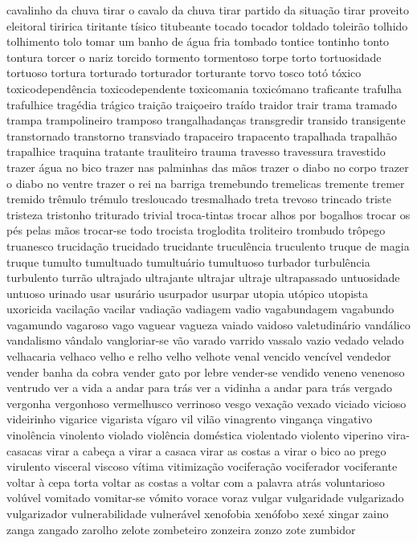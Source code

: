 \documentclass[ruledheader]{abnt_UFF}
\begin{document}
cavalinho da chuva tirar o cavalo da chuva tirar partido da situa\c{c}\~ao tirar proveito eleitoral tiririca tiritante t\'{i}sico titubeante tocado tocador toldado toleir\~ao tolhido tolhimento tolo tomar um banho de \'{a}gua fria tombado tontice tontinho tonto tontura torcer o nariz torcido tormento tormentoso torpe torto tortuosidade tortuoso tortura torturado torturador torturante torvo tosco tot\'{o} t\'{o}xico toxicodepend\^{e}ncia toxicodependente toxicomania toxic\'{o}mano traficante trafulha trafulhice trag\'{e}dia tr\'{a}gico trai\c{c}\~ao trai\c{c}oeiro tra\'{i}do traidor trair trama tramado trampa trampolineiro tramposo trangalhadan\c{c}as transgredir transido transigente transtornado transtorno transviado trapaceiro trapacento trapalhada trapalh\~ao trapalhice traquina tratante trauliteiro trauma travesso travessura travestido trazer \'{a}gua no bico trazer nas palminhas das m\~aos trazer o diabo no corpo trazer o diabo no ventre trazer o rei na barriga tremebundo tremelicas tremente tremer tremido tr\^{e}mulo tr\'{e}mulo tresloucado tresmalhado treta trevoso trincado triste tristeza tristonho triturado trivial troca-tintas trocar alhos por bogalhos trocar os p\'{e}s pelas m\~aos trocar-se todo trocista troglodita troliteiro trombudo tr\^{o}pego truanesco trucida\c{c}\~ao trucidado trucidante trucul\^{e}ncia truculento truque de magia truque tumulto tumultuado tumultu\'{a}rio tumultuoso turbador turbul\^{e}ncia turbulento turr\~ao ultrajado ultrajante ultrajar ultraje ultrapassado untuosidade untuoso urinado usar usur\'{a}rio usurpador usurpar utopia ut\'{o}pico utopista uxoricida vacila\c{c}\~ao vacilar vadia\c{c}\~ao vadiagem vadio vagabundagem vagabundo vagamundo vagaroso vago vaguear vagueza vaiado vaidoso valetudin\'{a}rio vand\'{a}lico vandalismo v\^{a}ndalo vangloriar-se v\~ao varado varrido vassalo vazio vedado velado velhacaria velhaco velho e relho velho velhote venal vencido venc\'{i}vel vendedor vender banha da cobra vender gato por lebre vender-se vendido veneno venenoso ventrudo ver a vida a andar para tr\'{a}s ver a vidinha a andar para tr\'{a}s vergado vergonha vergonhoso vermelhusco verrinoso vesgo vexa\c{c}\~ao vexado viciado vicioso videirinho vigarice vigarista v\'{i}garo vil vil\~ao vinagrento vingan\c{c}a vingativo vinol\^{e}ncia vinolento violado viol\^{e}ncia dom\'{e}stica violentado violento viperino vira-casacas virar a cabe\c{c}a a virar a casaca virar as costas a virar o bico ao prego virulento visceral viscoso v\'{i}tima vitimiza\c{c}\~ao vocifera\c{c}\~ao vociferador vociferante voltar \`{a} cepa torta voltar as costas a voltar com a palavra atr\'{a}s voluntarioso vol\'{u}vel vomitado vomitar-se v\'{o}mito vorace voraz vulgar vulgaridade vulgarizado vulgarizador vulnerabilidade vulner\'{a}vel xenofobia xen\'{o}fobo xex\'{e} xingar zaino zanga zangado zarolho zelote zombeteiro zonzeira zonzo zote zumbidor 
\end{document}
